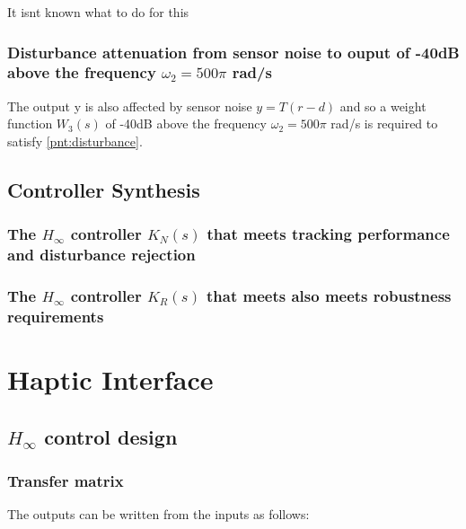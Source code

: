 \documentclass{article}
\begin{document}
It isnt known what to do for this

\subsubsection{Disturbance attenuation from sensor noise to ouput of -40dB above the frequency $\omega_2 = 500\pi$ rad/s \label{pnt:disturbance}}

The output y is also affected by sensor noise $y = T(r - d)$ and so a weight function $W_3(s)$ of -40dB above the frequency $\omega_2 = 500\pi$ rad/s is required to satisfy \ref{pnt:disturbance}.

\subsection{Controller Synthesis}

\subsubsection{The $H_\infty$ controller $K_N(s)$ that meets tracking performance and disturbance rejection}

\subsubsection{The $H_\infty$ controller $K_R(s)$ that meets also meets robustness requirements}

\section{Haptic Interface}

\subsection{ $H_\infty$ control design}

\subsubsection{Transfer matrix}

The outputs can be written from the inputs as follows:
\end{document}
